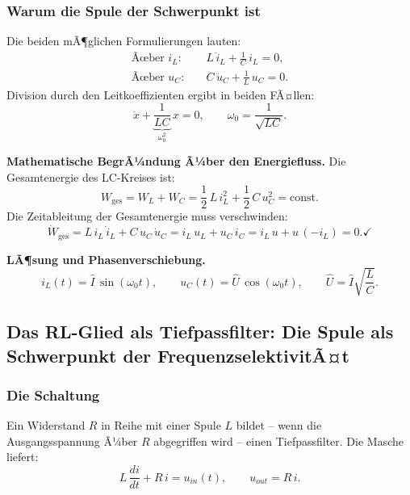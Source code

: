 ﻿\documentclass[12pt, a4paper]{article}
\begin{document}
	\subsubsection*{Warum die Spule der Schwerpunkt ist}
	
	Die beiden mÃ¶glichen Formulierungen lauten:
	\begin{align}
		\text{Ãœber } i_L{:}\quad &
		L\,\ddot{i}_L + \frac{1}{C}\,i_L = 0, \label{eq:lc_spule_form} \\
		\text{Ãœber } u_C{:}\quad &
		C\,\ddot{u}_C + \frac{1}{L}\,u_C = 0. \label{eq:lc_kond_form}
	\end{align}
	Division durch den Leitkoeffizienten ergibt in beiden FÃ¤llen:
	\begin{equation}
		\ddot{x} + \underbrace{\frac{1}{LC}}_{\omega_0^2}\,x = 0,
		\qquad \omega_0 = \frac{1}{\sqrt{LC}}.
		\label{eq:lc_standardform}
	\end{equation}
	
	\textbf{Mathematische BegrÃ¼ndung Ã¼ber den Energiefluss.}
	Die Gesamtenergie des LC-Kreises ist:
	\begin{equation}
		W_{\mathrm{ges}} = W_L + W_C
		= \frac{1}{2}\,L\,i_L^2 + \frac{1}{2}\,C\,u_C^2 = \mathrm{const}.
		\label{eq:lc_energie}
	\end{equation}
	Die Zeitableitung der Gesamtenergie muss verschwinden:
	\begin{equation}
		\dot{W}_{\mathrm{ges}}
		= L\,i_L\,\dot{i}_L + C\,u_C\,\dot{u}_C
		= i_L\,u_L + u_C\,i_C
		= i_L\,u + u\,(-i_L) = 0. \checkmark
	\end{equation}
	
	\textbf{LÃ¶sung und Phasenverschiebung.}
	\begin{equation}
		i_L(t) = \hat{I}\,\sin(\omega_0 t), \qquad
		u_C(t) = \hat{U}\,\cos(\omega_0 t),
		\qquad \hat{U} = \hat{I}\sqrt{\frac{L}{C}}.
		\label{eq:lc_loesung}
	\end{equation}
	
	\subsection{Das RL-Glied als Tiefpassfilter: Die Spule als Schwerpunkt der FrequenzselektivitÃ¤t}
	\label{sec:schwerpunkt_rl_tiefpass}
	
	\subsubsection*{Die Schaltung}
	
	Ein Widerstand $R$ in Reihe mit einer Spule $L$ bildet -- wenn die Ausgangsspannung
	Ã¼ber $R$ abgegriffen wird -- einen Tiefpassfilter. Die Masche liefert:
	\begin{equation}
		L\,\frac{di}{dt} + R\,i = u_{in}(t),
		\qquad u_{out} = R\,i.
		\label{eq:rl_tp_masche}
	\end{equation}
	
\end{document}

